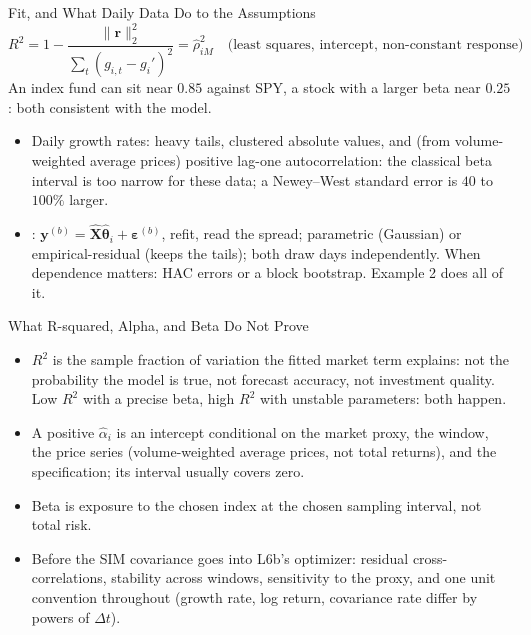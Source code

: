 \documentclass[aspectratio=169,11pt]{beamer}
\newcommand{\beps}{\boldsymbol{\varepsilon}}
\newcommand{\bX}{\hat{\mathbf{X}}}
\newcommand{\by}{\mathbf{y}}
\newcommand{\bth}{\boldsymbol{\theta}}
\begin{document}
\begin{frame}{Fit, and What Daily Data Do to the Assumptions}
  \[
    R^2=1-\frac{\lVert\mathbf r\rVert_2^2}{\sum_t(g_{i,t}-g_i')^2}=\hat\rho_{iM}^2
    \quad\text{(least squares, intercept, non-constant response)}
  \]
  \vspace{-0.6em}
  An index fund can sit near $0.85$ against SPY, a stock with a larger beta
  near $0.25$: both consistent with the model.
  \vspace{-0.15em}

  \begin{itemize}\setlength{\itemsep}{0.3em}
    \item Daily growth rates: heavy tails, clustered absolute values, and (from
      volume-weighted average prices) positive lag-one autocorrelation: the
      classical beta interval is too narrow for these data; a Newey--West
      standard error is $40$ to $100\%$ larger.
    \item {}: $\by^{(b)}=\bX\hat{\bth}_i+\beps^{(b)}$, refit,
      read the spread; parametric (Gaussian) or empirical-residual (keeps the
      tails); both draw days independently. When dependence matters: HAC errors
      or a block bootstrap. Example 2 does all of it.
  \end{itemize}
  \vspace{-0.2em}
\end{frame}

\begin{frame}{What R-squared, Alpha, and Beta Do Not Prove}
  \begin{itemize}\setlength{\itemsep}{0.55em}
    \item $R^2$ is the sample fraction of variation the fitted market term
      explains: not the probability the model is true, not forecast accuracy,
      not investment quality. Low $R^2$ with a precise beta, high $R^2$ with
      unstable parameters: both happen.
    \item A positive $\hat\alpha_i$ is an intercept conditional on the market
      proxy, the window, the price series (volume-weighted average prices, not
      total returns), and the specification; its interval usually covers zero.
    \item Beta is exposure to the chosen index at the chosen sampling interval,
      not total risk.
    \item Before the SIM covariance goes into L6b's optimizer: residual
      cross-correlations, stability across windows, sensitivity to the proxy,
      and one unit convention throughout (growth rate, log return, covariance
      rate differ by powers of $\Delta t$).
  \end{itemize}
\end{frame}
\end{document}
